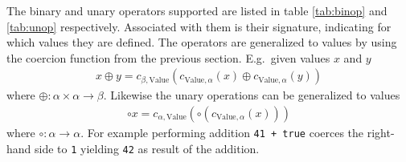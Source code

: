 The binary and unary operators supported are listed in table \ref{tab:binop} and \ref{tab:unop} respectively. Associated with them is their signature, indicating for which values they are defined. The operators are generalized to values by using the coercion function from the previous section. E.g.\ given values $x$ and $y$
\begin{align*}
    x \oplus y =  c_{\beta, \text{Value}}(c_{\text{Value}, \alpha}(x) \oplus c_{\text{Value},\alpha}(y))
\end{align*}
where $\oplus : \alpha \times \alpha \rightarrow \beta$. Likewise the unary operations can be generalized to values 
\begin{align*}
    \circ x = c_{\alpha, \text{Value}}(\circ (c_{\text{Value}, \alpha}(x)))
\end{align*}
where $\circ : \alpha \rightarrow \alpha $. For example performing addition \texttt{41 + true} coerces the right-hand side to \texttt{1} yielding \texttt{42} as result of the addition. 

\begin{comment}
Notice how the signature of the decrement is different from increment. This follows from the \emph{feature} that decrementing a variable containing \texttt{null} is not coerced to 0 and then decremented, but instead leaves the variable unchanged. This leads to the abstract decrement operation $\texttt{- -}: \text{Value}\rightarrow\text{Value}$.
\begin{align*}
		\texttt{- -} (v_a, v_s, v_n, v_b, v_u) =
		& (\bot, \bot, \notag\\
		&\quad\texttt{- -}(\coerce{Array}{Number}(v_a)\notag\\
		&\quad\quad\sqcup\coerce{String}{Number}(v_s) \notag\\
		&\quad\quad\sqcup v_n \notag\\
		&\quad\quad\sqcup \coerce{Boolean}{Number}(v_b)), \bot, v_u)
\end{align*}
where $\texttt{- -} : \text{Number}\rightarrow\text{Number}$ is defined by table \ref{tab:abs_dec_inl}.

\begin{table}

\centering
\begin{tabular}{l|ccccc}
\texttt{- -} 	& $\bot$ 	& $n$ 	& uInt		& notUInt	&$\top$ \\\hline
			 	& $\bot$ 	& $n-1$	& $\top$	& notUInt	&$\top$	
\end{tabular}
\caption{Abstract pre- and post-decrement\label{tab:abs_dec_inl}}

\end{table}
\end{comment}

